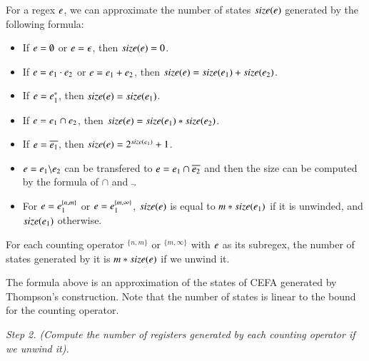 For a regex $e$, we can approximate the number of states $size(e)$ generated by the following formula: 
\begin{itemize}
  \item If $e = \emptyset$ or $e = \epsilon$, then $size(e) = 0$. 
  \item If $e = e_1 \cdot e_2$ or $e = e_1 + e_2$, then $size(e) = size(e_1) + size(e_2)$.
  \item If $e = e_1^*$, then $size(e) = size(e_1)$.
  \item If $e = e_1 \cap e_2$, then $size(e) = size(e_1)*size(e_2)$.
  \item If $e = \overline{e_1}$, then $size(e) = 2^{size(e_1)} + 1$.
  \item $e = e_1 \backslash e_2$ can be transfered to $e = e_1 \cap \overline{e_2}$ and then the size can be computed by the formula of $\cap$ and $\bar{}$.
  \item For $e = e_1^{\{n,m\}}$ or $e = e_1^{\{m,\infty\}}$, $size(e)$ is equal to $m*size(e_1)$ if it is unwinded, and $size(e_1)$ otherwise.
\end{itemize}

For each counting operator $^{\{n,m\}}$ or $^{\{m,\infty\}}$ with $e$ as its subregex, the number of states generated by it is $m*size(e)$ if we unwind it.

The formula above is an approximation of the states of CEFA generated by Thompson's construction. Note that the number of states is linear to the bound for the counting operator.

\medskip
\noindent
\emph{Step 2. (Compute the number of registers generated by each counting operator if we unwind it).}

